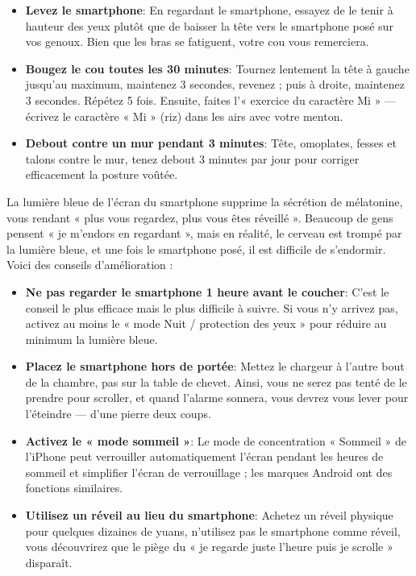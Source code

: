 \begin{itemize}
  \item \textbf{Levez le smartphone}: En regardant le smartphone, essayez de le tenir à hauteur des yeux plutôt que de baisser la tête vers le smartphone posé sur vos genoux. Bien que les bras se fatiguent, votre cou vous remerciera.
  \item \textbf{Bougez le cou toutes les 30 minutes}: Tournez lentement la tête à gauche jusqu'au maximum, maintenez 3 secondes, revenez ; puis à droite, maintenez 3 secondes. Répétez 5 fois. Ensuite, faites l'« exercice du caractère Mi » — écrivez le caractère « Mi » (riz) dans les airs avec votre menton.
  \item \textbf{Debout contre un mur pendant 3 minutes}: Tête, omoplates, fesses et talons contre le mur, tenez debout 3 minutes par jour pour corriger efficacement la posture voûtée.
\end{itemize}


La lumière bleue de l'écran du smartphone supprime la sécrétion de mélatonine, vous rendant « plus vous regardez, plus vous êtes réveillé ». Beaucoup de gens pensent « je m'endors en regardant », mais en réalité, le cerveau est trompé par la lumière bleue, et une fois le smartphone posé, il est difficile de s'endormir. Voici des conseils d'amélioration :

\begin{itemize}
  \item \textbf{Ne pas regarder le smartphone 1 heure avant le coucher}: C'est le conseil le plus efficace mais le plus difficile à suivre. Si vous n'y arrivez pas, activez au moins le « mode Nuit / protection des yeux » pour réduire au minimum la lumière bleue.
  \item \textbf{Placez le smartphone hors de portée}: Mettez le chargeur à l'autre bout de la chambre, pas sur la table de chevet. Ainsi, vous ne serez pas tenté de le prendre pour scroller, et quand l'alarme sonnera, vous devrez vous lever pour l'éteindre — d'une pierre deux coups.
  \item \textbf{Activez le « mode sommeil »}: Le mode de concentration « Sommeil » de l'iPhone peut verrouiller automatiquement l'écran pendant les heures de sommeil et simplifier l'écran de verrouillage ; les marques Android ont des fonctions similaires.
  \item \textbf{Utilisez un réveil au lieu du smartphone}: Achetez un réveil physique pour quelques dizaines de yuans, n'utilisez pas le smartphone comme réveil, vous découvrirez que le piège du « je regarde juste l'heure puis je scrolle » disparaît.
\end{itemize}

